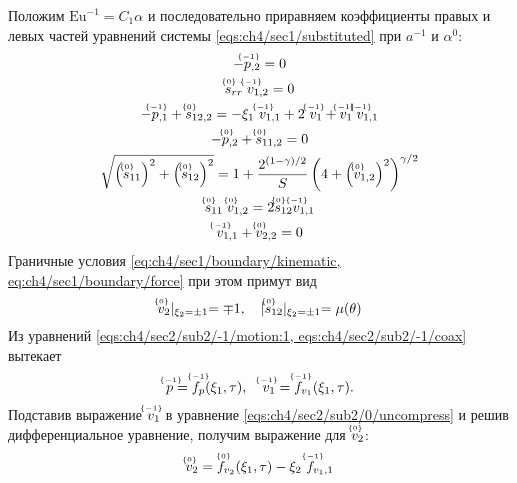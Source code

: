 Положим $\text{Eu}^{-1} = C_1 \alpha$ и последовательно приравняем коэффициенты правых и левых частей уравнений системы \cref{eqs:ch4/sec1/substituted} при $a^{-1}$ и $\alpha^0$:
\begin{subequations}
  \label{eqs:ch4/sec2/sub2/main}
  \begin{gather}
    \label{eqs:ch4/sec2/sub2/-1/motion:1}
    -\uindex{p}{-1}_{,2} = 0
    \\
    \label{eqs:ch4/sec2/sub2/-1/coax}
    \uindex{s}{0}_{rr} \; \uindex{v}{-1}_{1,2} = 0
    \\
    \label{eqs:ch4/sec2/sub2/0/motion:1}
    -\uindex{p}{-1}_{,1} + \uindex{s}{0}_{12,2} = -\xi_1 \ \uindex{v}{-1}_{1,1} + 2 \ \uindex{v}{-1}_{1} + \uindex{v}{-1}_{1} \; \uindex{v}{-1}_{1,1}
    \\
    \label{eqs:ch4/sec2/sub2/0/motion:2}
    -\uindex{p}{0}_{,2} + \uindex{s}{0}_{11,2} = 0
    \\
    \label{eqs:ch4/sec2/sub2/0/plasticity}
    \sqrt{\left(\uindex{s}{0}_{11}\right)^2 + \left(\uindex{s}{0}_{12}\right)^2} = 1 + \frac{2^{(1-\gamma)/2}}{S} \left(4+\left(\uindex{v}{0}_{1,2}\right)^2\right)^{\gamma/2}
    \\
    \label{eqs:ch4/sec2/sub2/0/coax}
    \uindex{s}{0}_{11} \; \uindex{v}{0}_{1,2} = 2 \uindex{s}{0}_{12} \uindex{v}{-1}_{1,1}
    \\
    \label{eqs:ch4/sec2/sub2/0/uncompress}
    \uindex{v}{-1}_{1,1} + \uindex{v}{0}_{2,2} = 0
  \end{gather}
\end{subequations}
Граничные условия \cref{eq:ch4/sec1/boundary/kinematic, eq:ch4/sec1/boundary/force} при этом примут вид
\begin{equation}
  \label{eq:ch4/sec2/sub2/boundary/0}
  \uindex{v}{0}_{2}\lvert_{\xi_2=\pm 1} = \mp 1, \quad \lvert \uindex{s}{0}_{12}\lvert_{\xi_2=\pm 1} = \mu(\theta)
\end{equation}
Из уравнений \cref{eqs:ch4/sec2/sub2/-1/motion:1, eqs:ch4/sec2/sub2/-1/coax} вытекает
\begin{equation*}
  \uindex{p}{-1} = \uindex{f}{-1}_{p}(\xi_1, \tau), \quad \uindex{v}{-1}_{1} = \uindex{f}{-1}_{v_{1}}(\xi_1, \tau).
\end{equation*}
Подставив выражение $\uindex{v}{-1}_{1}$ в уравнение \cref{eqs:ch4/sec2/sub2/0/uncompress} и решив дифференциальное уравнение, получим выражение для $\uindex{v}{0}_{2}$:
\begin{equation*}
  \uindex{v}{0}_{2} = \uindex{f}{0}_{v_{2}}(\xi_1, \tau) - \xi_2 \ \uindex{f}{-1}_{v_{1},1}
\end{equation*}
